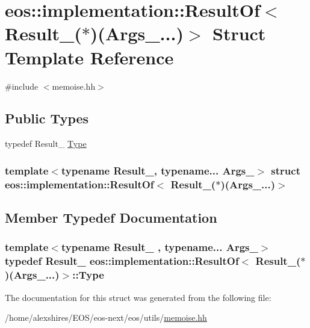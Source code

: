 \hypertarget{structeos_1_1implementation_1_1ResultOf_3_01Result___07_5_08_07Args___8_8_8_08_4}{
\section{eos::implementation::ResultOf$<$ Result\_\-($\ast$)(Args\_\-...)$>$ Struct Template Reference}
\label{structeos_1_1implementation_1_1ResultOf_3_01Result___07_5_08_07Args___8_8_8_08_4}
}


{\ttfamily \#include $<$memoise.hh$>$}\subsection*{Public Types}
\begin{DoxyCompactItemize}
\item 
typedef Result\_\- \hyperlink{structeos_1_1implementation_1_1ResultOf_3_01Result___07_5_08_07Args___8_8_8_08_4_aee86cd65eda09566ce90b009ddfb27b9}{Type}
\end{DoxyCompactItemize}
\subsubsection*{template$<$typename Result\_\-, typename... Args\_\-$>$ struct eos::implementation::ResultOf$<$ Result\_\-($\ast$)(Args\_\-...)$>$}



\subsection{Member Typedef Documentation}
\hypertarget{structeos_1_1implementation_1_1ResultOf_3_01Result___07_5_08_07Args___8_8_8_08_4_aee86cd65eda09566ce90b009ddfb27b9}{
\subsubsection[{Type}]{\setlength{\rightskip}{0pt plus 5cm}template$<$typename Result\_\- , typename... Args\_\-$>$ typedef Result\_\- eos::implementation::ResultOf$<$ Result\_\-($\ast$)(Args\_\-...)$>$::{\bf Type}}}
\label{structeos_1_1implementation_1_1ResultOf_3_01Result___07_5_08_07Args___8_8_8_08_4_aee86cd65eda09566ce90b009ddfb27b9}


The documentation for this struct was generated from the following file:\begin{DoxyCompactItemize}
\item 
/home/alexshires/EOS/eos-\/next/eos/utils/\hyperlink{memoise_8hh}{memoise.hh}\end{DoxyCompactItemize}
